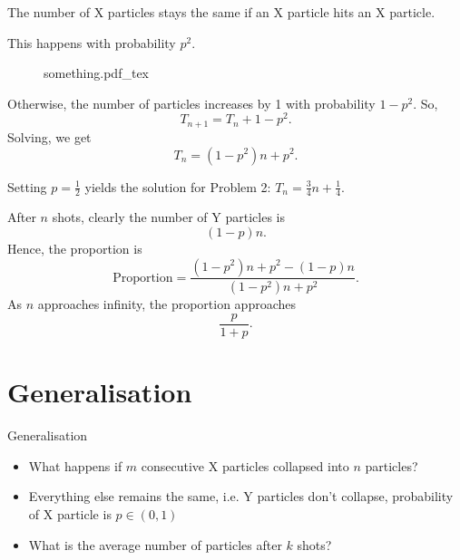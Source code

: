 \documentclass[xcolor={usenames,dvipsnames}]{beamer}
\newcommand{\incfig}[1]{%
  \def\svgwidth{0.3\textwidth}
  {#1.pdf_tex}
}
\begin{document}
\begin{frame}
  The number of X particles stays the same if an X particle hits an X particle.

  This happens with probability $p^2$.

  \begin{multicols}{2}
  \begin{figure}[ht]
    \centering
    \incfig{something}
    \label{fig:stuff}
  \end{figure}
  \columnbreak
  Otherwise, the number of particles increases by 1 with probability $1-p^2$. So, \[
    T_{n+1} = T_n + 1-p^2
  .\] Solving, we get \[
    T_n = (1-p^2)n + p^2
    .\] \end{multicols}
    Setting $p = \frac{1}{2}$ yields the solution for Problem 2: $
    T_n = \frac{3}{4}n + \frac{1}{4}
  $.
\end{frame}
\begin{frame}
  After $n$ shots, clearly the number of Y particles is \[
    (1-p)n
  .\] Hence, the proportion is 
  \begin{equation*}
    \text{Proportion} = \frac{(1-p^2)n + p^2 - (1-p)n}{(1-p^2)n + p^2}.
\end{equation*}
As $n$ approaches infinity, the proportion approaches \[
  \frac{p}{1+p}
.\] 
\end{frame}

\section{Generalisation}
\begin{frame}{Generalisation}
  \begin{itemize}
    \item What happens if $m$ consecutive X particles collapsed into $n$ particles?
    \item Everything else remains the same, i.e. Y particles don't collapse, probability of X particle is $p \in (0, 1)$
    \item What is the average number of particles after $k$ shots?
  \end{itemize}
\end{frame}
\end{document}
